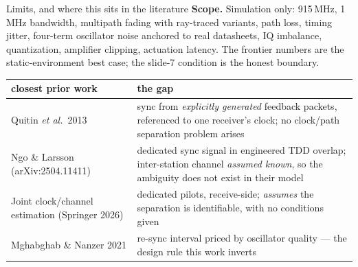 \documentclass[aspectratio=169,10pt]{beamer}
\begin{document}
\begin{frame}{Limits, and where this sits in the literature}
  \textbf{Scope.} Simulation only: 915\,MHz, 1\,MHz bandwidth,
  multipath fading with ray-traced variants, path loss, timing
  jitter, four-term oscillator noise anchored to real datasheets, IQ
  imbalance, quantization, amplifier clipping, actuation latency.
  The frontier numbers are the static-environment best case; the
  slide-7 condition is the honest boundary.
  \vspace{0.5em}
  \small
  \begin{tabular}{@{}p{}p{}@{}}
    \toprule
    closest prior work & the gap \\
    \midrule
    Quitin \emph{et al.}\ 2013 & sync from \emph{explicitly generated}
    feedback packets, referenced to one receiver's clock; no
    clock/path separation problem arises \\
    Ngo \& Larsson (arXiv:2504.11411) & dedicated sync signal in
    engineered TDD overlap; inter-station channel \emph{assumed
    known}, so the ambiguity does not exist in their model \\
    Joint clock/channel estimation (Springer 2026) & dedicated
    pilots, receive-side; \emph{assumes} the separation is
    identifiable, with no conditions given \\
    Mghabghab \& Nanzer 2021 & re-sync interval priced by oscillator
    quality --- the design rule this work inverts \\
    \bottomrule
  \end{tabular}
\end{frame}
\end{document}
